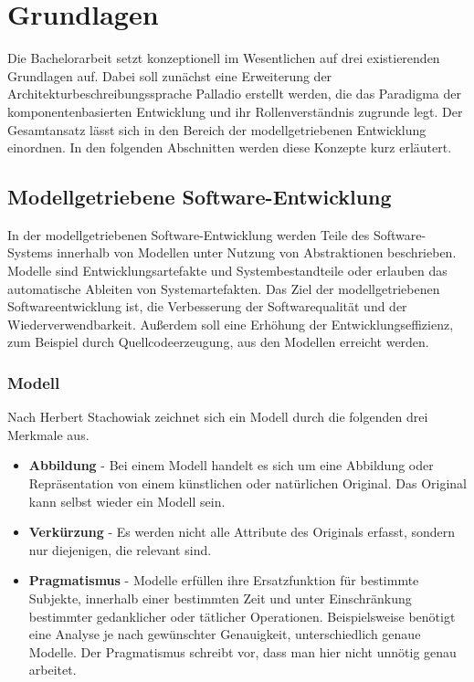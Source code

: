 
\chapter{Grundlagen}
\label{ch:grundlagen}
Die Bachelorarbeit setzt konzeptionell im Wesentlichen auf drei existierenden Grundlagen auf. Dabei soll zunächst eine Erweiterung der Architekturbeschreibungssprache Palladio \cite{Becker2010} erstellt werden, die das Paradigma der komponentenbasierten Entwicklung \cite{Koziolek2006} und ihr Rollenverständnis zugrunde legt. Der Gesamtansatz lässt sich in den Bereich der modellgetriebenen Entwicklung \cite{Stahl2007} einordnen. In den folgenden Abschnitten werden diese Konzepte kurz erläutert.

\section{Modellgetriebene Software-Entwicklung}
\label{sec:modellgetriebeneSE}
In der modellgetriebenen Software-Entwicklung \cite{Stahl2007} werden Teile des Software-Systems innerhalb von Modellen unter Nutzung von Abstraktionen beschrieben. Modelle sind Entwicklungsartefakte und Systembestandteile oder erlauben das automatische Ableiten von Systemartefakten. Das Ziel der modellgetriebenen Softwareentwicklung ist, die Verbesserung der Softwarequalität und der Wiederverwendbarkeit. Außerdem soll eine Erhöhung der Entwicklungseffizienz, zum Beispiel durch Quellcodeerzeugung, aus den Modellen erreicht werden. 

\subsection{Modell}
\label{sec:Modell}
Nach Herbert Stachowiak \cite{Stachowiak1973} zeichnet sich ein Modell durch die folgenden drei Merkmale aus.
\begin{itemize}
\item \textbf{Abbildung} - Bei einem Modell handelt es sich um eine Abbildung oder Repräsentation von einem künstlichen oder natürlichen Original. Das Original kann selbst wieder ein Modell sein. 
\item \textbf{Verkürzung} - Es werden nicht alle Attribute des Originals erfasst, sondern nur diejenigen, die relevant sind.
\item \textbf{Pragmatismus} - Modelle erfüllen ihre Ersatzfunktion für bestimmte Subjekte, innerhalb einer bestimmten Zeit und unter Einschränkung bestimmter gedanklicher oder tätlicher Operationen. Beispielsweise benötigt eine Analyse je nach gewünschter Genauigkeit, unterschiedlich genaue Modelle. Der Pragmatismus schreibt vor, dass man hier nicht unnötig genau arbeitet.
\end{itemize} 


